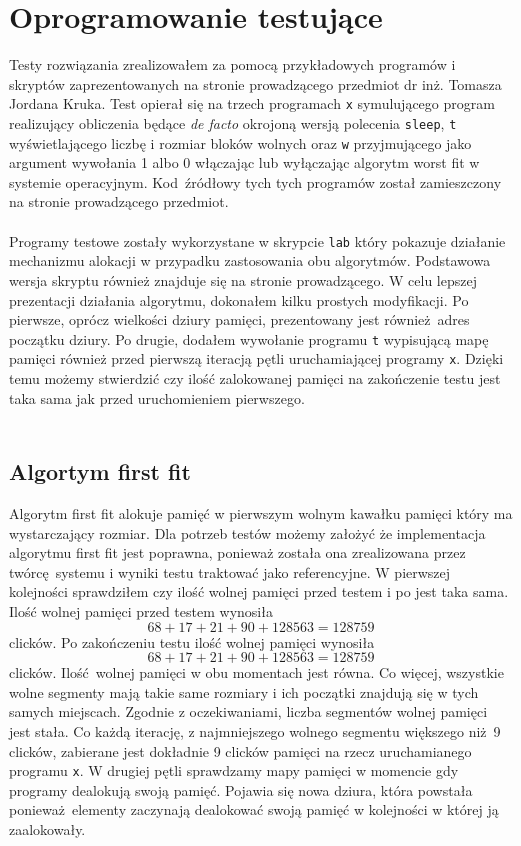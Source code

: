 \documentclass{mwrep}
\begin{document}
\section{Oprogramowanie testujące}
\label{REALIZACJA::TESTY}
Testy rozwiązania zrealizowałem za pomocą przykładowych programów i skryptów zaprezentowanych
na stronie prowadzącego przedmiot dr inż. Tomasza Jordana Kruka. Test opierał się na trzech programach
\texttt{x} symulującego program realizujący obliczenia będące \emph{de facto} okrojoną wersją polecenia
\texttt{sleep}, \texttt{t} wyświetlającego liczbę i rozmiar bloków wolnych oraz \texttt{w} przyjmującego jako 
argument wywołania 1 albo 0 włączając lub wyłączając algorytm worst fit w systemie operacyjnym. Kod źródłowy tych 
tych programów został zamieszczony na stronie  prowadzącego przedmiot. \\
\\
Programy testowe zostały wykorzystane w skrypcie \texttt{lab} który pokazuje działanie mechanizmu alokacji w przypadku 
zastosowania obu algorytmów. Podstawowa wersja skryptu również znajduje się na stronie prowadzącego. W celu 
lepszej prezentacji działania algorytmu, dokonałem kilku prostych modyfikacji. Po pierwsze, oprócz 
wielkości dziury pamięci, prezentowany jest również adres początku dziury. Po drugie, dodałem wywołanie
programu \texttt{t} wypisującą mapę pamięci również przed pierwszą iteracją pętli uruchamiającej programy \texttt{x}.
Dzięki temu możemy stwierdzić czy ilość zalokowanej pamięci na zakończenie testu jest taka sama jak przed uruchomieniem pierwszego.\\
\\

\subsection{Algortym first fit}
\label{REALIZACJA::TESTY::WORSTFIT}
Algorytm first fit alokuje pamięć w pierwszym wolnym kawałku pamięci który ma wystarczający rozmiar.
Dla potrzeb testów możemy założyć że implementacja algorytmu first fit jest poprawna, ponieważ została ona zrealizowana 
przez twórcę systemu i wyniki testu traktować jako referencyjne. 
W pierwszej kolejności sprawdziłem czy ilość wolnej pamięci przed testem i po jest taka sama. Ilość wolnej pamięci przed
testem wynosiła $$ 68 + 17 + 21 + 90 + 128563 = 128759 $$ clicków. Po zakończeniu testu ilość wolnej pamięci wynosiła 
$$ 68 + 17 + 21 + 90 + 128563 = 128759 $$ clicków. Ilość wolnej pamięci w obu momentach jest równa. Co więcej, wszystkie wolne segmenty
mają takie same rozmiary i ich początki znajdują się w tych samych miejscach. Zgodnie z oczekiwaniami, liczba 
segmentów wolnej pamięci jest stała. Co każdą iterację, z najmniejszego wolnego segmentu większego niż 9 clicków, zabierane jest dokładnie 
9 clicków pamięci na rzecz uruchamianego programu \texttt{x}. 
W drugiej pętli sprawdzamy mapy pamięci w momencie gdy programy dealokują swoją pamięć. Pojawia się nowa dziura, która powstała
ponieważ elementy zaczynają dealokować swoją pamięć w kolejności w której ją zaalokowały.
\end{document}
